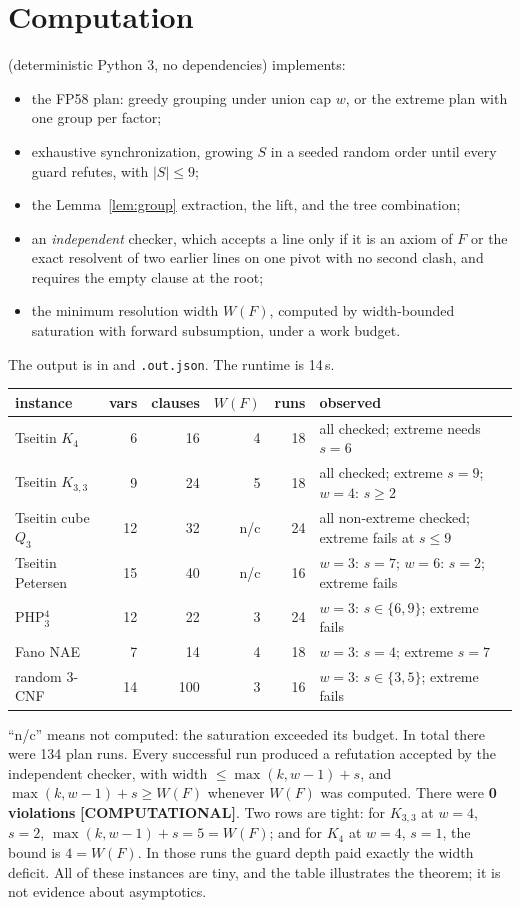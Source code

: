 \documentclass[11pt]{article}
\theoremstyle{definition}
\theoremstyle{remark}
\newcommand{\lab}[1]{\textbf{[#1]}}
\begin{document}
\section{Computation}\label{sec:comp}
 (deterministic Python 3, no dependencies)
implements:
\begin{itemize}
\item the FP58 plan: greedy grouping under union cap $w$, or the extreme plan with one group
per factor;
\item exhaustive synchronization, growing $S$ in a seeded random order until every guard
refutes, with $|S|\le9$;
\item the Lemma~\ref{lem:group} extraction, the lift, and the tree combination;
\item an \emph{independent} checker, which accepts a line only if it is an axiom of $F$ or the
exact resolvent of two earlier lines on one pivot with no second clash, and requires the
empty clause at the root;
\item the minimum resolution width $W(F)$, computed by width-bounded saturation with forward
subsumption, under a work budget.
\end{itemize}
The output is in  and \texttt{.out.json}. The
runtime is 14\,s.

\begin{center}
\begin{tabular}{lrrrrl}
\toprule
instance & vars & clauses & $W(F)$ & runs & observed\\
\midrule
Tseitin $K_4$ & 6 & 16 & 4 & 18 & all checked; extreme needs $s=6$\\
Tseitin $K_{3,3}$ & 9 & 24 & 5 & 18 & all checked; extreme $s=9$; $w{=}4$: $s\ge2$\\
Tseitin cube $Q_3$ & 12 & 32 & n/c & 24 & all non-extreme checked; extreme fails at $s\le9$\\
Tseitin Petersen & 15 & 40 & n/c & 16 & $w{=}3$: $s=7$; $w{=}6$: $s=2$; extreme fails\\
PHP$^4_3$ & 12 & 22 & 3 & 24 & $w{=}3$: $s\in\{6,9\}$; extreme fails\\
Fano NAE & 7 & 14 & 4 & 18 & $w{=}3$: $s=4$; extreme $s=7$\\
random 3-CNF & 14 & 100 & 3 & 16 & $w{=}3$: $s\in\{3,5\}$; extreme fails\\
\bottomrule
\end{tabular}
\end{center}
``n/c'' means not computed: the saturation exceeded its budget. In total there were 134 plan
runs. Every successful run produced a refutation accepted by the independent checker, with
width $\le\max(k,w-1)+s$, and $\max(k,w-1)+s\ge W(F)$ whenever $W(F)$ was computed. There
were \textbf{0 violations} \lab{COMPUTATIONAL}. Two rows are tight: for $K_{3,3}$ at $w=4$,
$s=2$, $\max(k,w-1)+s=5=W(F)$; and for $K_4$ at $w=4$, $s=1$, the bound is $4=W(F)$. In those
runs the guard depth paid exactly the width deficit. All of these instances are tiny, and the
table illustrates the theorem; it is not evidence about asymptotics.
\end{document}
